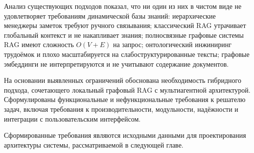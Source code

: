 Анализ существующих подходов показал, что ни один из них в чистом виде не удовлетворяет требованиям динамической базы знаний: иерархические менеджеры заметок требуют ручного связывания; классический RAG утрачивает глобальный контекст и не накапливает знания; полносвязные графовые системы RAG имеют сложность $O(V+E)$ на запрос; онтологический инжиниринг трудоёмок и плохо масштабируется на слабоструктурированные тексты; графовые эмбеддинги не интерпретируются и не учитывают содержание документов.

На основании выявленных ограничений обоснована необходимость гибридного подхода, сочетающего локальный графовый RAG с мультиагентной архитектурой. Сформулированы функциональные и нефункциональные требования к решателю задач, включая требования к производительности, модульности, надёжности и интеграции с пользовательским интерфейсом.

Сформированные требования являются исходными данными для проектирования архитектуры системы, рассматриваемой в следующей главе.
